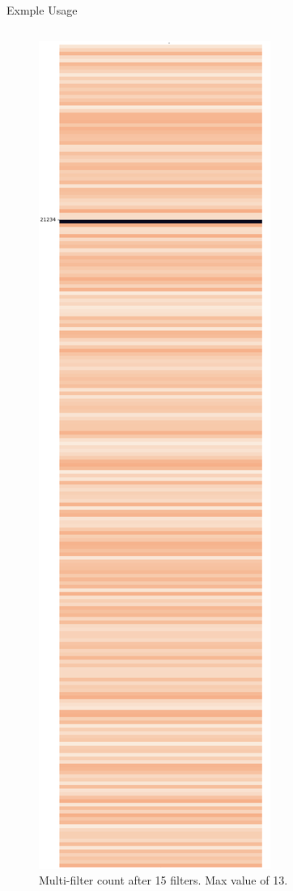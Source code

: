 \begin{frame}{Exmple Usage}
\begin{columns}
\begin{column}{.33\textwidth}
\begin{figure}
                \includegraphics[height=.7\textheight]{../Images/model_pipeline_tikz/CyberPred/anomaly_score.pdf} 
            \caption{Multi-filter count after 15 filters. Max value of 13. }       
            \end{figure}
            \ec
        \end{column}
    \end{columns}
\end{frame}


